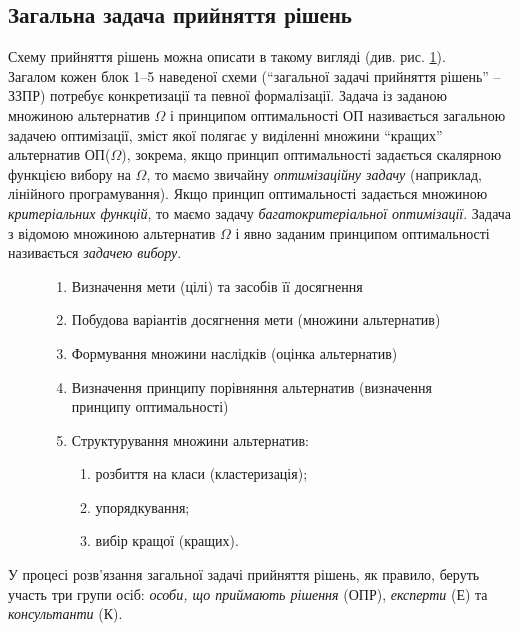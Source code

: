 \subsection{Загальна задача прийняття рішень}

Схему прийняття рішень можна описати в такому вигляді (див. рис. \ref{fig:1.1.1}). \\

Загалом кожен блок 1–5 наведеної схеми (``загальної задачі прийняття рішень'' -- ЗЗПР) потребує конкретизації та певної формалізації. Задача із заданою множиною альтернатив $\Omega$ і принципом оптимальності ОП називається загальною задачею оптимізації, зміст якої полягає у виділенні множини ``кращих'' альтернатив ОП($\Omega$), зокрема, якщо принцип оптимальності задається скалярною функцією вибору на $\Omega$, то маємо звичайну \textit{оптимізаційну задачу} (наприклад, лінійного програмування). Якщо принцип оптимальності задається множиною \textit{критеріальних функцій}, то маємо задачу \textit{багатокритеріальної оптимізації}. Задача з відомою множиною альтернатив $\Omega$ і явно заданим принципом оптимальності називається \textit{задачею вибору}.

\begin{figure}
	\label{fig:1.1.1}
	\begin{enumerate}
		\item Визначення мети (цілі) та засобів її досягнення
		\item Побудова варіантів досягнення мети (множини альтернатив)
		\item Формування множини наслідків (оцінка альтернатив)
		\item Визначення принципу порівняння альтернатив (визначення принципу оптимальності)
		\item Структурування множини альтернатив:
		\begin{enumerate}
			\item розбиття на класи (кластеризація);
			\item упорядкування;
			\item вибір кращої (кращих).
		\end{enumerate}
	\end{enumerate}
\end{figure}

У процесі розв'язання загальної задачі прийняття рішень, як правило, беруть участь три групи осіб: \textit{особи, що приймають рішення} (ОПР), \textit{експерти} (Е) та \textit{консультанти} (К). \\

